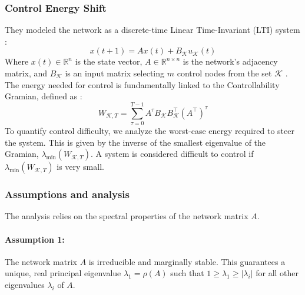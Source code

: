 \documentclass[11pt, a4paper]{article}
\begin{document}
\subsubsection{Control Energy Shift}
They modeled the network as a discrete-time Linear Time-Invariant (LTI) system :
\begin{equation}
    x(t+1) = Ax(t) + B_{\mathcal{K}}u_{\mathcal{K}}(t)
    \label{eq:lti}
\end{equation}
Where $x(t) \in \mathbb{R}^n$ is the state vector, $A \in \mathbb{R}^{n \times n}$ is the network's adjacency matrix, and $B_{\mathcal{K}}$ is an input matrix selecting $m$ control nodes from the set $\mathcal{K}$ . The energy needed for control is fundamentally linked to the Controllability Gramian, defined as :
\begin{equation}
    W_{\mathcal{K},T} = \sum_{\tau=0}^{T-1}A^{\tau}B_{\mathcal{K}}B_{\mathcal{K}}^{\top}(A^{\top})^{\tau}
    \label{eq:gramian}
\end{equation}
To quantify control difficulty, we analyze the worst-case energy required to steer the system. This is given by the inverse of the smallest eigenvalue of the Gramian, $\lambda_{\min}(W_{\mathcal{K},T})$. A system is considered difficult to control if $\lambda_{\min}(W_{\mathcal{K},T})$ is very small.
\subsubsection{Assumptions and analysis}
The analysis relies on the spectral properties of the network matrix $A$.

\paragraph{Assumption 1:} \label{sec:assumpt1} The network matrix $A$ is irreducible and marginally stable. This guarantees a unique, real principal eigenvalue $\lambda_1 = \rho(A)$ such that $1 \ge \lambda_1 \ge |\lambda_i|$ for all other eigenvalues $\lambda_i$ of $A$.
\end{document}
